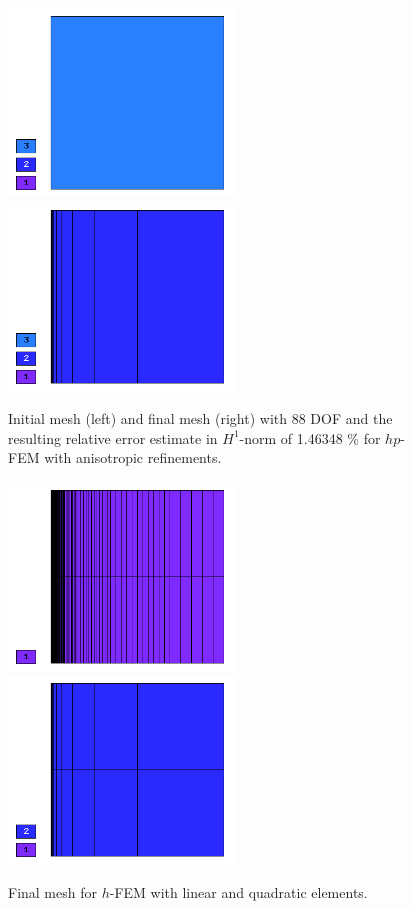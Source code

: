 \documentclass[12pt]{elsarticle}
\begin{document}
\begin{figure}[!ht]
\centering
\includegraphics[height=5cm]{nist/nist-7/mesh_hp_aniso_init.png}\ \
\includegraphics[height=5cm]{nist/nist-7/mesh_hp_aniso.png}
\caption{Initial mesh (left) and final mesh (right) with 88 DOF and the resulting relative error estimate in $H^1$-norm of 1.46348 \% for $hp$-FEM with anisotropic refinements.}
\label{fig:nist-7-hp-aniso}
\end{figure}

\begin{figure}[!ht]
\centering
\includegraphics[height=5cm]{nist/nist-7/mesh_h1_aniso.png}\ \
\includegraphics[height=5cm]{nist/nist-7/mesh_h2_aniso.png}
\caption{Final mesh for $h$-FEM with linear and quadratic elements.}
\label{fig:nist-7-h-aniso}
\end{figure}
\end{document}
